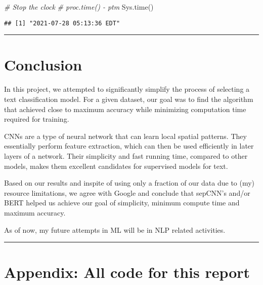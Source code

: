 \documentclass[
]{article}
\newenvironment{Shaded}{}{}
\newcommand{\CommentTok}[1]{\textcolor[rgb]{0.38,0.63,0.69}{\textit{#1}}}
\newcommand{\FunctionTok}[1]{\textcolor[rgb]{0.02,0.16,0.49}{#1}}
\newcommand{\NormalTok}[1]{#1}
\begin{document}
\begin{Shaded}
\begin{Highlighting}[]
\CommentTok{\# Stop the clock}
\CommentTok{\# proc.time() {-} ptm}
\FunctionTok{Sys.time}\NormalTok{()}
\end{Highlighting}
\end{Shaded}

\begin{verbatim}
## [1] "2021-07-28 05:13:36 EDT"
\end{verbatim}

\begin{center}\rule{0.5\linewidth}{0.5pt}\end{center}

\newpage

\hypertarget{conclusion}{%
\section{Conclusion}\label{conclusion}}

In this project, we attempted to significantly simplify the process of
selecting a text classification model. For a given dataset, our goal was
to find the algorithm that achieved close to maximum accuracy while
minimizing computation time required for training.

CNNs are a type of neural network that can learn local spatial patterns.
They essentially perform feature extraction, which can then be used
efficiently in later layers of a network. Their simplicity and fast
running time, compared to other models, makes them excellent candidates
for supervised models for text.

Based on our results and inspite of using only a fraction of our data
due to (my) resource limitations, we agree with Google and conclude that
sepCNN's and/or BERT helped us achieve our goal of simplicity, minimum
compute time and maximum accuracy.

As of now, my future attempts in ML will be in NLP related activities.

\begin{center}\rule{0.5\linewidth}{0.5pt}\end{center}

\newpage

\hypertarget{appendix-all-code-for-this-report}{%
\section{Appendix: All code for this
report}\label{appendix-all-code-for-this-report}}
\end{document}
